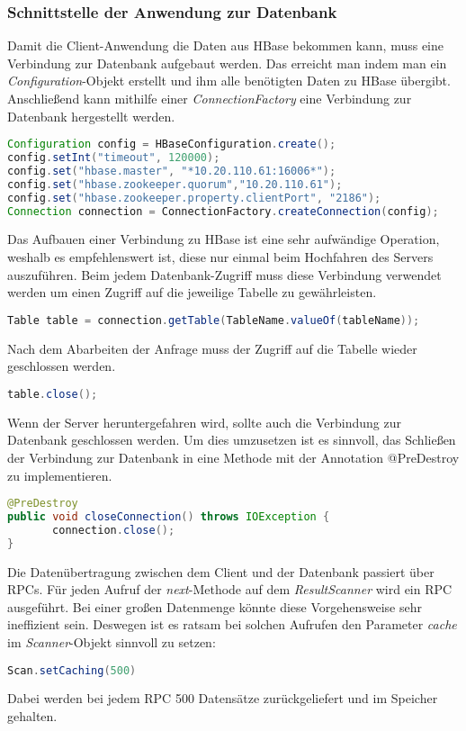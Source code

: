 \subsubsection{Schnittstelle der Anwendung zur Datenbank}\label{schnittstelle}

Damit die Client-Anwendung die Daten aus HBase bekommen kann, muss eine Verbindung zur Datenbank aufgebaut werden.
Das erreicht man indem man ein \textit{Configuration}-Objekt erstellt und ihm alle benötigten Daten zu HBase übergibt. Anschließend kann  mithilfe einer \textit{ConnectionFactory} eine Verbindung zur Datenbank hergestellt werden.

\begin{lstlisting}[language=Java]
Configuration config = HBaseConfiguration.create();
config.setInt("timeout", 120000);
config.set("hbase.master", "*10.20.110.61:16006*");
config.set("hbase.zookeeper.quorum","10.20.110.61");
config.set("hbase.zookeeper.property.clientPort", "2186");
Connection connection = ConnectionFactory.createConnection(config);
\end{lstlisting}

Das Aufbauen einer Verbindung zu HBase ist eine sehr aufwändige Operation, weshalb es empfehlenswert ist, diese nur einmal beim Hochfahren des Servers auszuführen.
Beim jedem Datenbank-Zugriff muss diese Verbindung verwendet werden um einen Zugriff auf die jeweilige Tabelle zu gewährleisten.

\begin{lstlisting}[language=Java]
Table table = connection.getTable(TableName.valueOf(tableName));
\end{lstlisting}

Nach dem Abarbeiten der Anfrage muss der Zugriff auf die Tabelle wieder geschlossen werden.
\begin{lstlisting}[language=Java]
table.close();
\end{lstlisting}

Wenn der Server heruntergefahren wird,  sollte auch die Verbindung zur Datenbank geschlossen werden.
Um dies umzusetzen ist es sinnvoll, das Schließen der Verbindung zur Datenbank in eine Methode mit der Annotation @PreDestroy zu implementieren.

\begin{lstlisting}[language=Java]
@PreDestroy
public void closeConnection() throws IOException {
       connection.close();
}
\end{lstlisting}

Die Datenübertragung zwischen dem Client und der Datenbank passiert über \acp{RPC}. Für jeden Aufruf der \textit{next}-Methode auf dem \textit{ResultScanner} wird ein \ac{RPC}  ausgeführt. Bei einer großen Datenmenge könnte diese Vorgehensweise sehr ineffizient sein. Deswegen ist es ratsam bei solchen Aufrufen den Parameter \textit{cache} im \textit{Scanner}-Objekt sinnvoll zu setzen:
\begin{lstlisting}[language=Java]
Scan.setCaching(500)
\end{lstlisting}
Dabei werden bei jedem \ac{RPC} 500 Datensätze zurückgeliefert und im Speicher gehalten.


